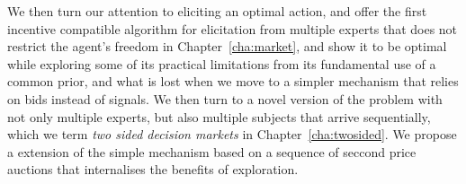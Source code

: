 We then turn our attention to eliciting an optimal action, and offer the first incentive compatible algorithm for elicitation from multiple experts that does not restrict the agent's freedom in Chapter~\ref{cha:market}, and show it to be optimal while exploring some of its practical limitations from its fundamental use of a common prior, and what is lost when we move to a simpler mechanism that relies on bids instead of signals. We then turn to a novel version of the problem with not only multiple experts, but also multiple subjects that arrive sequentially, which we term \emph{two sided decision markets} in Chapter~\ref{cha:twosided}. We propose a extension of the simple mechanism based on a sequence of seccond price auctions that internalises the benefits of exploration.

